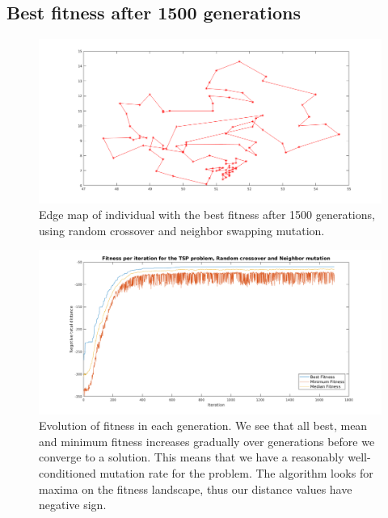 \documentclass[14pt,a4paper,openright,twoside]{extreport}
\begin{document}
\subsection*{\textbf{Best fitness after 1500 generations}}
\begin{figure}[H]
    \begin{center}
        \includegraphics[width=\textwidth]{tspmap_randomcross_neighbormutate_1500_after.png}
        \caption{\small{Edge map of individual with the best fitness after 1500 generations, using random crossover and neighbor swapping mutation.}}
        \label{mapsolution1500}
    \end{center}
\end{figure}

\begin{figure}[H]
    \begin{center}
        \includegraphics[width=\textwidth]{tspmap_randomcross_neighbormutate_1500_fitness.png}
        \caption{\small{Evolution of fitness in each generation. We see that all best, mean and minimum fitness increases gradually over generations before we converge to a solution. This means that we have a reasonably well-conditioned mutation rate for the problem. The algorithm looks for maxima on the fitness landscape, thus our distance values have negative sign.}}
        \label{fitness1500}
    \end{center}
\end{figure}
\end{document}
